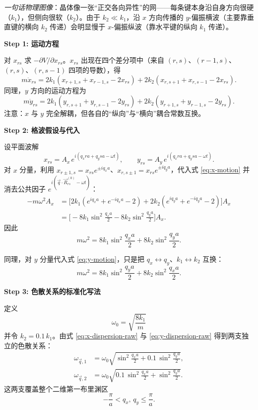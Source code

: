 \begin{derivationbox}[标准解题过程]
\textit{一句话物理图像}：晶体像一张``正交各向异性''的网——每条键本身沿自身方向很硬（$k_1$），但侧向很软（$k_2$）。由于 $k_2\ll k_1$，沿 $x$ 方向传播的 $y$-偏振横波（主要靠垂直键的横向 $k_2$ 传递）会明显慢于 $x$-偏振纵波（靠水平键的纵向 $k_1$ 传递）。

\textbf{Step 1: 运动方程}

对 $x_{rs}$ 求 $-\partial V/\partial x_{rs}$。$x_{rs}$ 出现在四个差分项中（来自 $(r,s)$、$(r-1,s)$、$(r,s)$、$(r,s-1)$ 四项的导数），得
\begin{equation}
m\ddot x_{rs} = 2k_1(x_{r+1,s}+x_{r-1,s}-2x_{rs}) + 2k_2(x_{r,s+1}+x_{r,s-1}-2x_{rs}).
\label{eq:x-motion}
\end{equation}
同理，$y$ 方向的运动方程为
\begin{equation}
m\ddot y_{rs} = 2k_1(y_{r,s+1}+y_{r,s-1}-2y_{rs}) + 2k_2(y_{r+1,s}+y_{r-1,s}-2y_{rs}).
\label{eq:y-motion}
\end{equation}
注意：$x$ 与 $y$ 完全解耦，但各自的``纵向''与``横向''耦合常数互换。

\textbf{Step 2: 格波假设与代入}

设平面波解
\[
x_{rs} = A_x\,e^{i(q_x ra + q_y sa - \omega t)}, \qquad y_{rs} = A_y\,e^{i(q_x ra + q_y sa - \omega t)}.
\]
对 $x$ 分量，利用 $x_{r\pm1,s} = x_{rs}e^{\pm iq_x a}$、$x_{r,s\pm1} = x_{rs}e^{\pm iq_y a}$，代入式 \eqref{eq:x-motion} 并消去公共因子 $e^{i(\vec q\cdot\vec R_{rs}^{(0)}-\omega t)}$：
\begin{align}
    -m\omega^2 A_x &= \bigl[2k_1(e^{iq_x a}+e^{-iq_x a}-2) + 2k_2(e^{iq_y a}+e^{-iq_y a}-2)\bigr]A_x \nonumber\\
    &= \bigl[-8k_1\sin^2\tfrac{q_x a}{2} - 8k_2\sin^2\tfrac{q_y a}{2}\bigr]A_x.
\end{align}
因此
\begin{equation}
m\omega^2 = 8k_1\sin^2\frac{q_x a}{2} + 8k_2\sin^2\frac{q_y a}{2}.
\label{eq:x-dispersion-raw}
\end{equation}

同理，对 $y$ 分量代入式 \eqref{eq:y-motion}，只是把 $q_x\leftrightarrow q_y$、$k_1\leftrightarrow k_2$ 互换：
\begin{equation}
m\omega^2 = 8k_1\sin^2\frac{q_y a}{2} + 8k_2\sin^2\frac{q_x a}{2}.
\label{eq:y-dispersion-raw}
\end{equation}

\textbf{Step 3: 色散关系的标准化写法}

定义
\begin{equation}
\boxed{\omega_0 = \sqrt{\frac{8k_1}{m}}}
\end{equation}
并令 $k_2 = 0.1\,k_1$。由式 \eqref{eq:x-dispersion-raw} 与 \eqref{eq:y-dispersion-raw} 得到两支独立的色散关系：
\begin{align}
    \omega_{\vec q,1} &= \omega_0\sqrt{\sin^2\frac{q_x a}{2} + 0.1\,\sin^2\frac{q_y a}{2}}, \label{eq:2d-disp-1}\\[4pt]
    \omega_{\vec q,2} &= \omega_0\sqrt{0.1\,\sin^2\frac{q_x a}{2} + \sin^2\frac{q_y a}{2}}. \label{eq:2d-disp-2}
\end{align}
这两支覆盖整个二维第一布里渊区
\[
-\frac{\pi}{a} < q_x,\,q_y \le \frac{\pi}{a}.
\]


\end{derivationbox}
